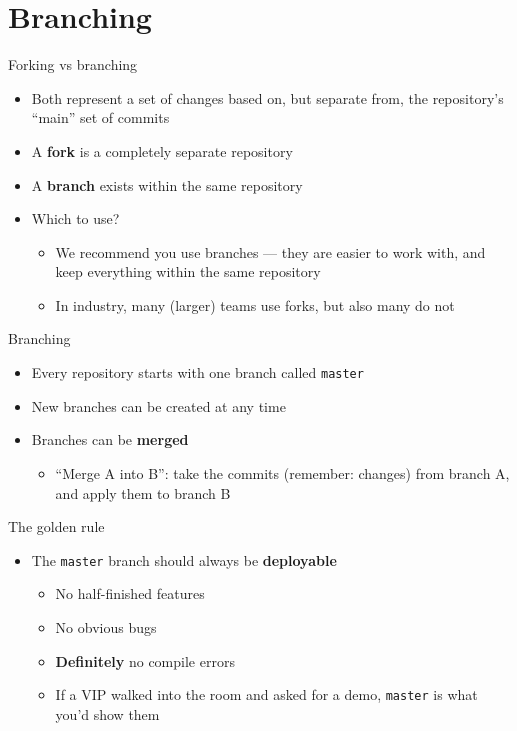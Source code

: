 \part{Branching}
\frame{\partpage}

\begin{frame}{Forking vs branching}
    \begin{itemize}
        \item Both represent a set of changes based on, but separate from,
            the repository's ``main'' set of commits \pause
        \item A \textbf{fork} is a completely separate repository \pause
        \item A \textbf{branch} exists within the same repository \pause
        \item Which to use? \pause
            \begin{itemize}
                \item We recommend you use branches ---
                    they are easier to work with, and keep everything within the same repository \pause
                \item In industry, many (larger) teams use forks, but also many do not
            \end{itemize}
    \end{itemize}
\end{frame}

\begin{frame}{Branching}
    \begin{itemize}
        \item Every repository starts with one branch called \texttt{master} \pause
        \item New branches can be created at any time \pause
        \item Branches can be \textbf{merged} \pause
            \begin{itemize}
                \item ``Merge A into B'':
                    take the commits (remember: changes) from branch A, and apply them to branch B
            \end{itemize}
    \end{itemize}
\end{frame}

\begin{frame}{The golden rule}
    \begin{itemize}
        \item The \texttt{master} branch should always be \textbf{deployable} \pause
            \begin{itemize}
                \item No half-finished features \pause
                \item No obvious bugs \pause
                \item \textbf{Definitely} no compile errors \pause
                \item If a VIP walked into the room and asked for a demo, \texttt{master} is what you'd show them
            \end{itemize}
    \end{itemize}
\end{frame}

